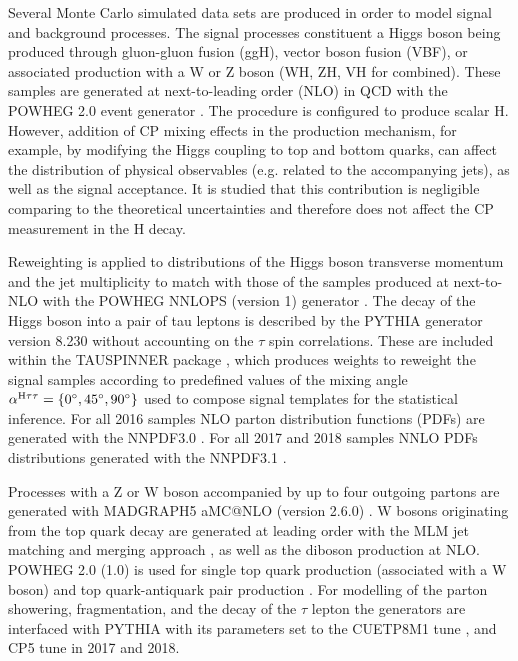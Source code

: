 Several Monte Carlo simulated data sets are produced in order to model signal and background processes. The signal processes constituent a Higgs boson being produced through gluon-gluon fusion (ggH), vector boson fusion (VBF), or associated production with a W or Z boson (WH, ZH, VH for combined). These samples are generated at next-to-leading order (NLO) in QCD with the POWHEG 2.0 event generator \cite{Nason:2004rx,Frixione:2007vw,Alioli:2010xd,Bagnaschi:2011tu,Nason:2009ai,Jezo:2015aia,Granata:2017iod}. The procedure is configured to produce scalar H. However, addition of CP mixing effects in the production mechanism, for example, by modifying the Higgs coupling to top and bottom quarks, can affect the distribution of physical observables (e.g. related to the accompanying jets), as well as the signal acceptance. It is studied that this contribution is negligible comparing to the theoretical uncertainties and therefore does not affect the CP measurement in the H decay.

Reweighting is applied to distributions of the Higgs boson transverse momentum and the jet multiplicity to match with those of the samples produced at next-to-NLO with the POWHEG NNLOPS (version 1) generator \cite{Hamilton:2013fea,Hamilton:2015nsa}. The decay of the Higgs boson into a pair of tau leptons is described by the PYTHIA generator version 8.230 \cite{Sjostrand:2014zea} without accounting on the $\tau$ spin correlations. These are included within the TAUSPINNER package \cite{Przedzinski:2018ett}, which produces weights to reweight the signal samples according to predefined values of the mixing angle $\alpha^{\text{H}\tau\tau}=\{0^\circ, 45^\circ, 90^\circ\}$ used to compose signal templates for the statistical inference. For all 2016 samples NLO parton distribution functions (PDFs) are generated with the NNPDF3.0 \cite{NNPDF:2014otw}. For all 2017 and 2018 samples NNLO PDFs distributions generated with the NNPDF3.1 \cite{NNPDF:2017mvq}.

Processes with a Z or W boson accompanied by up to four outgoing partons are generated with MADGRAPH5 aMC@NLO (version 2.6.0) \cite{Alwall:2014hca}. W bosons originating from the top quark decay are generated at leading order with the MLM jet matching and merging approach \cite{Alwall:2007fs}, as well as the diboson production at NLO. POWHEG 2.0 (1.0) is used for single top quark production (associated with a W boson) \cite{Re:2010bp,Frederix:2012dh} and top quark-antiquark pair production \cite{Alioli:2011as}. For modelling of the parton showering, fragmentation, and the decay of the $\tau$ lepton the generators are interfaced with PYTHIA with its parameters set to the CUETP8M1 tune \cite{CMS:2015wcf} , and CP5 tune \cite{CMS:2019csb} in 2017 and 2018. 

